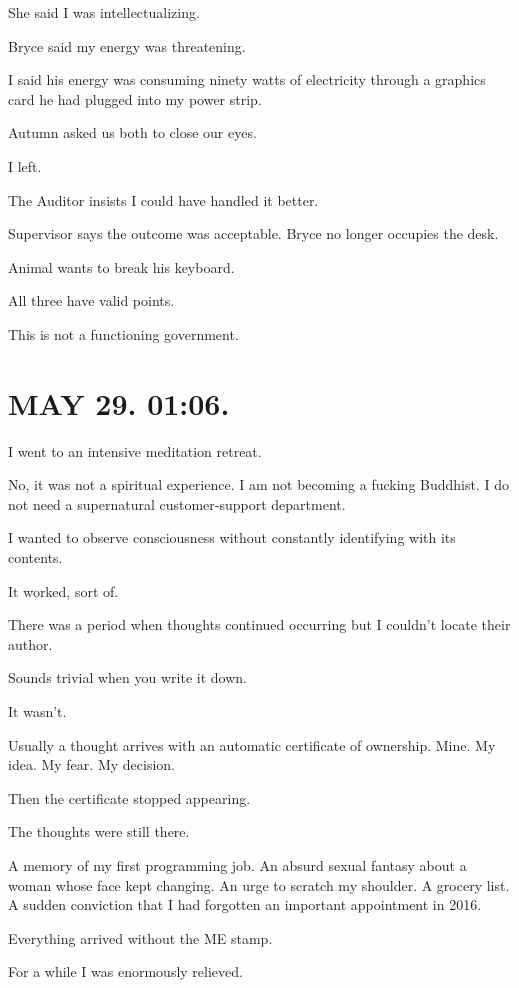 \documentclass[11pt,oneside]{book}
\begin{document}
She said I was intellectualizing.

Bryce said my energy was threatening.

I said his energy was consuming ninety watts of electricity through a graphics card he had plugged into my power strip.

Autumn asked us both to close our eyes.

I left.

The Auditor insists I could have handled it better.

Supervisor says the outcome was acceptable. Bryce no longer occupies the desk.

Animal wants to break his keyboard.

All three have valid points.

This is not a functioning government.

\section*{MAY 29. 01:06.}

I went to an intensive meditation retreat.

No, it was not a spiritual experience. I am not becoming a fucking Buddhist. I do not need a supernatural customer-support department.

I wanted to observe consciousness without constantly identifying with its contents.

It worked, sort of.

There was a period when thoughts continued occurring but I couldn't locate their author.

Sounds trivial when you write it down.

It wasn't.

Usually a thought arrives with an automatic certificate of ownership. Mine. My idea. My fear. My decision.

Then the certificate stopped appearing.

The thoughts were still there.

A memory of my first programming job. An absurd sexual fantasy about a woman whose face kept changing. An urge to scratch my shoulder. A grocery list. A sudden conviction that I had forgotten an important appointment in 2016.

Everything arrived without the ME stamp.

For a while I was enormously relieved.
\end{document}
